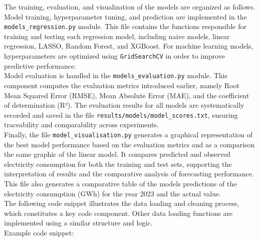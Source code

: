 \documentclass[11pt,a4paper]{article}
\begin{document}
The training, evaluation, and visualization of the models are organized as follows. 
Model training, hyperparameter tuning, and prediction are implemented in the \texttt{models\_regression.py} module. This file contains the functions responsible for training and testing each regression model, including naive models, linear regression, LASSO, Random Forest, and XGBoost. For machine learning models, hyperparameters are optimized using \texttt{GridSearchCV} in order to improve predictive performance. \\
Model evaluation is handled in the \texttt{models\_evaluation.py} module. This component computes the evaluation metrics introduced earlier, namely Root Mean Squared Error (RMSE), Mean Absolute Error (MAE), and the coefficient of determination (R²). The evaluation results for all models are systematically recorded and saved in the file \texttt{results/models/model\_scores.txt}, ensuring traceability and comparability across experiments.\\
Finally, the file \texttt{model\_visualisation.py} generates a graphical representation of the best model performance based on the evaluation metrics and as a comparison the same graphic of the linear model. It compares predicted and observed electricity consumption for both the training and test sets, supporting the interpretation of results and the comparative analysis of forecasting performance. This file also generates a comparative table of the models predictions of the electricity consumption (GWh) for the year 2023 and the actual value.\\

The following code snippet illustrates the data loading and cleaning process, which constitutes a key code component. Other data loading functions are implemented using a similar structure and logic.\\

Example code snippet:
\end{document}
